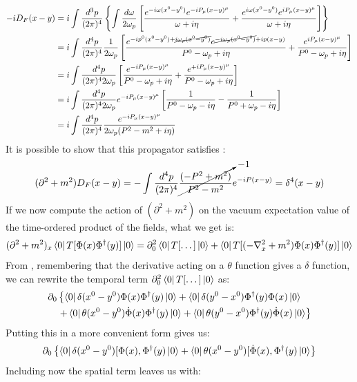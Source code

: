 \documentclass[../main.tex]{subfiles}
\begin{document}
\begin{align*}
-iD_F(x-y)&=i\int\frac{d^3p}{(2\pi)^4}\left\{\int\frac{d\omega}{2\omega_p}\left[\frac{e^{-i\omega(x^0-y^0)}e^{-iP_\mu(x-y)^\mu}}{\omega+i\eta}+\frac{e^{i\omega(x^0-y^0)}e^{iP_\mu(x-y)^\mu}}{\omega+i\eta}\right]\right\}\\
&=i\int\frac{d^4p}{(2\pi)^4}\frac{1}{2\omega_p}\left[\frac{e^{-ip^0(x^0-y^0)+\cancel{i\omega_p(x^0-y^0)}}e^{\cancel{-i\omega_p(x^0-y^0)}+ip(x-y)}}{P^0-\omega_p+i\eta}+\frac{e^{iP_\mu(x-y)^\mu}}{P^0-\omega_p+i\eta}\right]\\
&=i\int\frac{d^4p}{(2\pi)^42\omega_p}\left[\frac{e^{-iP_\mu(x-y)^\mu}}{P^0-\omega_p+i\eta}+\frac{e^{+iP_\mu(x-y)^\mu}}{P^0-\omega_p+i\eta}\right]\\
&=i\int\frac{d^4p}{(2\pi)^42\omega_p}e^{-iP_\mu(x-y)^\mu}\left[\frac{1}{P^0-\omega_p-i\eta}-\frac{1}{P^0+\omega_p-i\eta}\right]\\
&=i\int\frac{d^4p}{(2\pi)^4}\frac{e^{-iP_\mu(x-y)^\mu}}{2\omega_p(P^2-m^2+i\eta)}
\end{align*}
It is possible to show that this propagator satisfies :
\[
(\partial^2+m^2)D_F(x-y)=-\int\frac{d^4p}{(2\pi)^4}\cancelto{-1}{\frac{(-P^2+m^2)}{P^2-m^2}}e^{-iP(x-y)}=\delta^4(x-y)
\]
If we now compute the action of $(\partial^2+m^2)$ on the vacuum expectation value of the time-ordered product of the fields, what we get is:
\[
(\partial^2+m^2)_x\bra{0}T[\Phi(x)\Phi^\dagger(y)]\ket{0}=\partial_0^2\bra{0}T[\dots]\ket{0}+\bra{0}T[(-\nabla^2_x+m^2)\Phi(x)\Phi^\dagger(y)]\ket{0}
\]
From , remembering that the derivative acting on a $\theta$ function gives a $\delta$ function, we can rewrite the temporal term $\partial_0^2\bra{0}T[\dots]\ket{0}$ as:
\begin{align*}
\partial_0&\left\{\bra{0}\delta(x^0-y^0)\Phi(x)\Phi^\dagger(y)\ket{0}+\bra{0}\delta(y^0-x^0)\Phi^\dagger(y)\Phi(x)\ket{0}\right.\\
&\left.+\bra{0}\theta(x^0-y^0)\Dot{\Phi}(x)\Phi^\dagger(y)\ket{0}+\bra{0}\theta(y^0-x^0)\Phi^\dagger(y)\Dot{\Phi}(x)\ket{0}\right\}
\end{align*}
Putting this in a more convenient form gives us:
\[
\partial_0\left\{\bra{0}\delta(x^0-y^0)[\Phi(x),\Phi^\dagger(y)\ket{0}+\bra{0}\theta(x^0-y^0)[\Dot{\Phi}(x),\Phi^\dagger(y)\ket{0}\right\}
\]
Including now the spatial term leaves us with:
\end{document}
